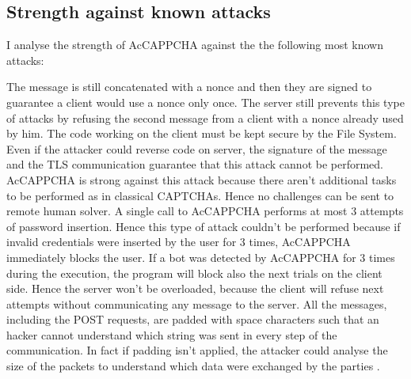 \subsection{Strength against known attacks}\label{Results:attacks}
I analyse the strength of AcCAPPCHA against the the following most known attacks:
\begin{itemize}
{The message is still concatenated with a nonce and then they are signed to guarantee a client would use a nonce only once. The server still prevents this type of attacks by refusing the second message from a client with a nonce already used by him.}
{The code working on the client must be kept secure by the File System. Even if the attacker could reverse code on server, the signature of the message and the TLS communication guarantee that this attack cannot be performed.}
{AcCAPPCHA is strong against this attack because there aren't additional tasks to be performed as in classical CAPTCHAs. Hence no challenges can be sent to remote human solver.}
{A single call to AcCAPPCHA performs at most 3 attempts of password insertion. Hence this type of attack couldn't be performed because if invalid credentials were inserted by the user for 3 times, AcCAPPCHA immediately blocks the user.
}
{If a bot was detected by AcCAPPCHA for 3 times during the execution, the program will block also the next trials on the client side. Hence the server won't be overloaded, because the client will refuse next attempts without communicating any message to the server.}
{All the messages, including the POST requests, are padded with space characters such that an hacker cannot understand which string was sent in every step of the communication. In fact if padding isn't applied, the attacker could analyse the size of the packets to understand which data were exchanged by the parties \cite{side_leaks}.}
\end{itemize}

